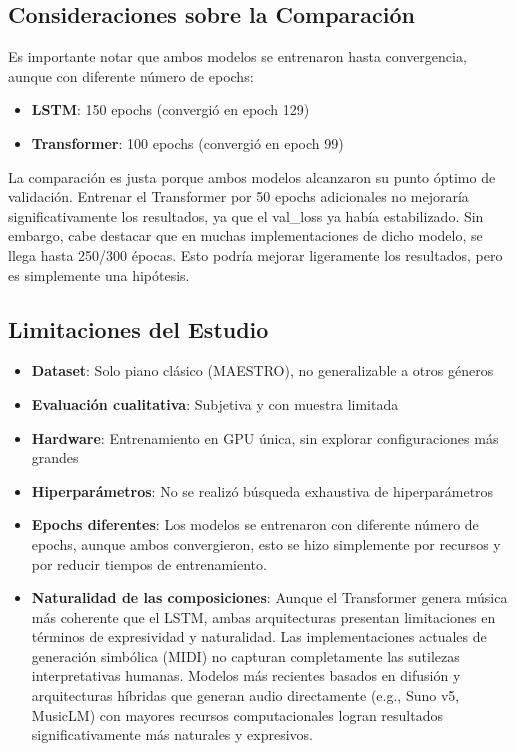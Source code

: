 \documentclass[12pt,a4paper]{article}
\begin{document}
\subsection{Consideraciones sobre la Comparación}

Es importante notar que ambos modelos se entrenaron hasta convergencia, aunque con diferente número de epochs:
\begin{itemize}
    \item \textbf{LSTM}: 150 epochs (convergió en epoch 129)
    \item \textbf{Transformer}: 100 epochs (convergió en epoch 99)
\end{itemize}

La comparación es justa porque ambos modelos alcanzaron su punto óptimo de validación. Entrenar el Transformer por 50 epochs adicionales no mejoraría significativamente los resultados, ya que el val\_loss ya había estabilizado. Sin embargo, cabe destacar que en muchas implementaciones de dicho modelo, se llega hasta 250/300 épocas. Esto podría mejorar ligeramente los resultados, pero es simplemente una hipótesis.

\subsection{Limitaciones del Estudio}

\begin{itemize}
    \item \textbf{Dataset}: Solo piano clásico (MAESTRO), no generalizable a otros géneros
    \item \textbf{Evaluación cualitativa}: Subjetiva y con muestra limitada
    \item \textbf{Hardware}: Entrenamiento en GPU única, sin explorar configuraciones más grandes
    \item \textbf{Hiperparámetros}: No se realizó búsqueda exhaustiva de hiperparámetros
    \item \textbf{Epochs diferentes}: Los modelos se entrenaron con diferente número de epochs, aunque ambos convergieron, esto se hizo simplemente por recursos y por reducir tiempos de entrenamiento.
     \item \textbf{Naturalidad de las composiciones}: Aunque el Transformer genera música más coherente que el LSTM, ambas arquitecturas presentan limitaciones en términos de expresividad y naturalidad. Las implementaciones actuales de generación simbólica (MIDI) no capturan completamente las sutilezas interpretativas humanas. Modelos más recientes basados en difusión y arquitecturas híbridas que generan audio directamente (e.g., Suno v5, MusicLM) con mayores recursos computacionales logran resultados significativamente más naturales y expresivos.
\end{itemize}
\end{document}

